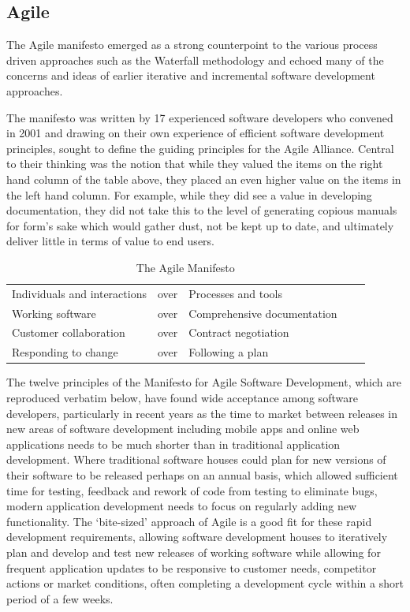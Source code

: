 \documentclass[a4paper,12pt]{article}
\begin{document}
\begin{samepage}
\begin{samepage}
\subsection {Agile}
The Agile manifesto emerged as a strong counterpoint to the various process driven approaches such as the Waterfall methodology and echoed many of the concerns and ideas of earlier iterative and incremental software development approaches.

The manifesto was written by 17 experienced software developers who convened in 2001 and drawing on their own experience of efficient software development principles, sought to define the guiding principles for the Agile Alliance. Central to their thinking was the notion that while they valued the items on the right hand column of the table above, they placed an even higher value on the items in the left hand column. For example, while they did see a value in developing documentation, they did not take this to the level of generating copious manuals for form's sake which would gather dust, not be kept up to date, and ultimately deliver little in terms of value to end users.

\begin{table}[]
\centering
\caption{The Agile Manifesto}
\label{my-label}
\begin{tabular}{|l|l|l|ll}
\cline{1-3}
Individuals and interactions & over & Processes and tools          \\ \cline{1-3}
Working software             & over & Comprehensive documentation \\ \cline{1-3}
Customer collaboration       & over & Contract negotiation        \\ \cline{1-3}
Responding to change         & over & Following a plan              \\ \cline{1-3}
\end{tabular}
\end{table}

The twelve principles of the Manifesto for Agile Software Development, which are reproduced verbatim below, have found wide acceptance among software developers, particularly in recent years as the time to market between releases in new areas of software development including mobile apps and online web applications needs to be much shorter than in traditional application development. Where traditional software houses could plan for new versions of their software to be released perhaps on an annual basis, which allowed sufficient time for testing, feedback and rework of code from testing to eliminate bugs, modern application development needs to focus on regularly adding new functionality. The `bite-sized' approach of Agile is a good fit for these rapid development requirements, allowing software development houses to iteratively plan and develop and test new releases of working software while allowing for frequent application updates to be responsive to customer needs, competitor actions or market conditions, often completing a development cycle within a short period of a few weeks.


\end{samepage}
\end{samepage}
\end{document}
